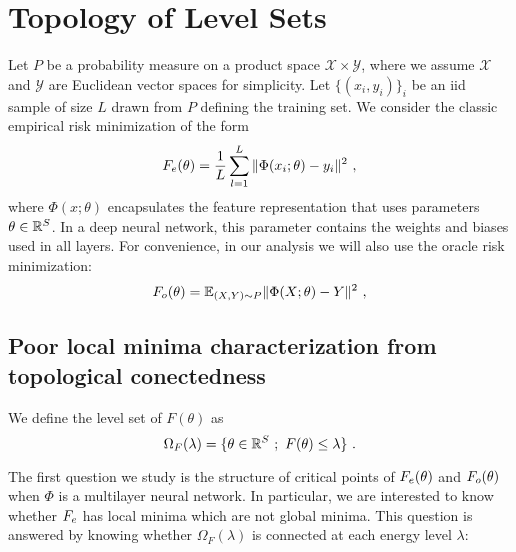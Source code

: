 \section{Topology of Level Sets}

Let $P$ be a probability measure on a product space $\mathcal{X} \times \mathcal{Y}$, 
where we assume $\mathcal{X}$ and $\mathcal{Y}$ are Euclidean vector spaces for simplicity.
Let $\{ (x_i, y_i)\}_i$ be an iid sample of size $L$ drawn from $P$ defining the training set.
We consider the classic empirical risk minimization of the form
\begin{equation}
\label{emp_risk_min}
F_{e}(\theta) = \frac{1}{L} \sum_{l=1}^L \| \Phi(x_i;\theta) - y_i \|^2~,
\end{equation}
where $\Phi(x ; \theta)$ encapsulates the feature representation 
that uses parameters $\theta \in {\mathbb{R}}^S$. In a deep neural network, this parameter
contains the weights and biases used in all layers.
For convenience, in our analysis we will also use the oracle risk minimization:
\begin{equation}
\label{risk_min}
F_{o}(\theta) = {\mathbb{E}}_{(X,Y) \sim P} \| \Phi(X;\theta) - Y \|^2~,
\end{equation}

\subsection{Poor local minima characterization from topological conectedness}

We define the level set of $F(\theta)$ as 
\begin{equation}
\Omega_F(\lambda) = \{ \theta \in {\mathbb{R}}^S~;~F(\theta) \leq \lambda \}~. 
\end{equation}

The first question we study is the structure of critical points of $F_{e}(\theta)$ and $F_{o}(\theta)$
when $\Phi$ is a multilayer neural network. In particular, we are interested to know whether
$F_{e}$ has local minima which are not global minima. This question is answered by 
knowing whether $\Omega_F(\lambda)$ is connected at each energy level $\lambda$:

